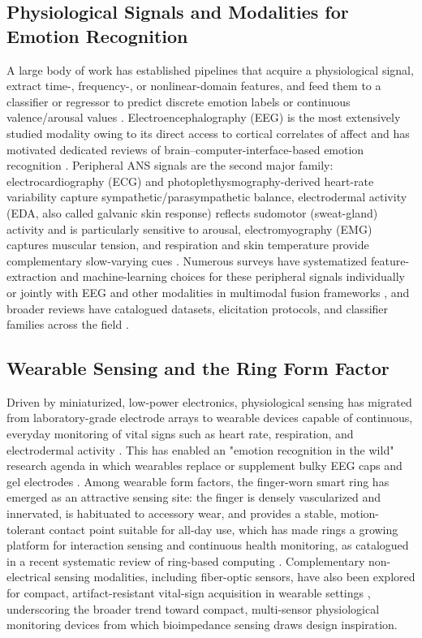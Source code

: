 \subsection{Physiological Signals and Modalities for Emotion Recognition}
A large body of work has established pipelines that acquire a physiological signal, extract time-, frequency-, or nonlinear-domain features, and feed them to a classifier or regressor to predict discrete emotion labels or continuous valence/arousal values \cite{shu2018review,egger2019emotion,lin2023review,younis2024machine}. Electroencephalography (EEG) is the most extensively studied modality owing to its direct access to cortical correlates of affect and has motivated dedicated reviews of brain--computer-interface-based emotion recognition \cite{houssein2022human}. Peripheral ANS signals are the second major family: electrocardiography (ECG) and photoplethysmography-derived heart-rate variability capture sympathetic/parasympathetic balance, electrodermal activity (EDA, also called galvanic skin response) reflects sudomotor (sweat-gland) activity and is particularly sensitive to arousal, electromyography (EMG) captures muscular tension, and respiration and skin temperature provide complementary slow-varying cues \cite{bulagang2020review,sanchezreolid2022machine,c2026survey,lin2023review}. Numerous surveys have systematized feature-extraction and machine-learning choices for these peripheral signals individually \cite{bulagang2020review,sanchezreolid2022machine} or jointly with EEG and other modalities in multimodal fusion frameworks \cite{udahemuka2024multimodal}, and broader reviews have catalogued datasets, elicitation protocols, and classifier families across the field \cite{shu2018review,khare2023emotion,shawon2024emotion,destyanto2023emotion}.

\subsection{Wearable Sensing and the Ring Form Factor}
Driven by miniaturized, low-power electronics, physiological sensing has migrated from laboratory-grade electrode arrays to wearable devices capable of continuous, everyday monitoring of vital signs such as heart rate, respiration, and electrodermal activity \cite{dias2018wearable,saganowski2022emotion}. This has enabled an "emotion recognition in the wild" research agenda in which wearables replace or supplement bulky EEG caps and gel electrodes \cite{saganowski2022emotion}. Among wearable form factors, the finger-worn smart ring has emerged as an attractive sensing site: the finger is densely vascularized and innervated, is habituated to accessory wear, and provides a stable, motion-tolerant contact point suitable for all-day use, which has made rings a growing platform for interaction sensing and continuous health monitoring, as catalogued in a recent systematic review of ring-based computing \cite{wang2025computing}. Complementary non-electrical sensing modalities, including fiber-optic sensors, have also been explored for compact, artifact-resistant vital-sign acquisition in wearable settings \cite{mayoral2021fiber}, underscoring the broader trend toward compact, multi-sensor physiological monitoring devices from which bioimpedance sensing draws design inspiration.

